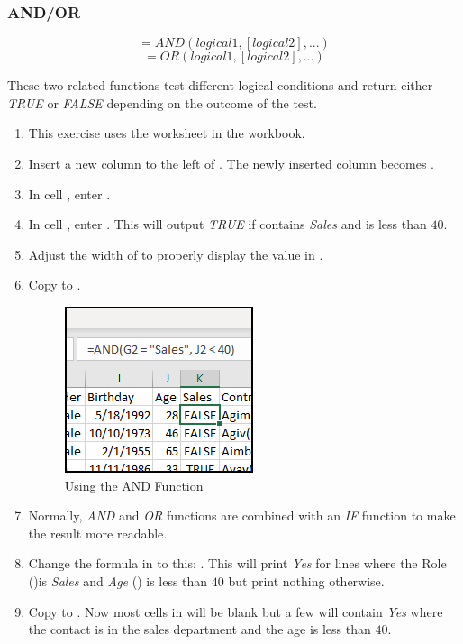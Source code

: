 \subsubsection{AND/OR}

\[ =AND(logical1, [logical2], ...) \]
\[ =OR(logical1, [logical2], ...) \]

These two related functions test different logical conditions and return either \textit{TRUE} or \textit{FALSE} depending on the outcome of the test. 

\begin{enumerate}
	\item This exercise uses the  worksheet in the  workbook.
	\item Insert a new column to the left of . The newly inserted column becomes .
	\item In cell , enter .
	\item In cell , enter . This will output \textit{TRUE} if  contains \textit{Sales} and  is less than $ 40 $. 
	\item Adjust the width of  to properly display the value in .
	\item Copy  to .
	
	\begin{figure}[H]
		\centering
		\includegraphics[width=\maxwidth{.75\linewidth}]{gfx/ch09_fig47}
		\caption{Using the AND Function}
		\label{09:fig47}
	\end{figure}

	\item Normally, \textit{AND} and \textit{OR} functions are combined with an \textit{IF} function to make the result more readable.
	\item Change the formula in  to this: . This will print \textit{Yes} for lines where the Role ()is \textit{Sales} and \textit{Age} () is less than $ 40 $ but print nothing otherwise. 
	\item Copy  to . Now most cells in  will be blank but a few will contain \textit{Yes} where the contact is in the sales department and the age is less than $ 40 $.
\end{enumerate}

